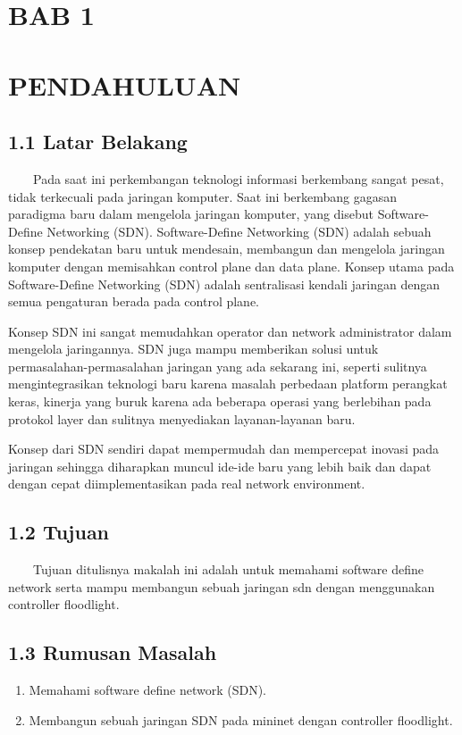 \begin{center}
\section{BAB 1}
\section{PENDAHULUAN}
\end{center}
\subsection{1.1 Latar Belakang}
\ \ \ \ Pada saat ini perkembangan teknologi informasi berkembang sangat pesat, tidak terkecuali pada jaringan komputer.
Saat ini berkembang gagasan paradigma baru dalam mengelola jaringan komputer, yang disebut Software-Define Networking
(SDN). Software-Define Networking (SDN) adalah sebuah konsep pendekatan baru untuk mendesain, membangun dan mengelola
jaringan komputer dengan memisahkan control plane dan data plane. Konsep utama pada Software-Define Networking (SDN)
adalah sentralisasi kendali jaringan dengan semua pengaturan berada pada control plane.

Konsep SDN ini sangat memudahkan operator dan network administrator dalam mengelola jaringannya. SDN juga mampu
memberikan solusi untuk permasalahan-permasalahan jaringan yang ada sekarang ini, seperti sulitnya mengintegrasikan
teknologi baru karena masalah perbedaan platform perangkat keras, kinerja yang buruk karena ada beberapa operasi yang
berlebihan pada protokol layer dan sulitnya menyediakan layanan-layanan baru.

Konsep dari SDN sendiri dapat mempermudah dan mempercepat inovasi pada jaringan sehingga diharapkan muncul ide-ide
baru yang lebih baik dan dapat dengan cepat diimplementasikan pada real network environment. 

\subsection{1.2 Tujuan}
\ \ \ \ Tujuan ditulisnya makalah ini adalah untuk memahami software define network serta mampu membangun sebuah jaringan
sdn dengan menggunakan controller floodlight.

\subsection{1.3 Rumusan Masalah}
\liststyleLi
\begin{enumerate}
\item Memahami software define network (SDN).
\item Membangun sebuah jaringan SDN pada mininet dengan controller floodlight.
\end{enumerate}
